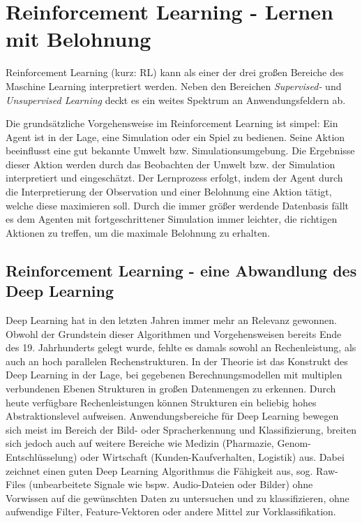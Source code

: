 
\chapter{Reinforcement Learning - Lernen mit Belohnung}
\label{chap:rl}
%

	Reinforcement Learning (kurz: RL) kann als einer der drei großen Bereiche des Maschine Learning interpretiert werden. Neben den Bereichen \textit{Supervised-} und  \textit{Unsupervised Learning} deckt es ein weites Spektrum an Anwendungsfeldern ab.
	
	Die grundsätzliche Vorgehensweise im Reinforcement Learning ist simpel: Ein Agent ist in der Lage, eine Simulation oder ein Spiel zu bedienen. Seine Aktion beeinflusst eine gut bekannte Umwelt bzw. Simulationsumgebung. Die Ergebnisse dieser Aktion werden durch das Beobachten der Umwelt bzw. der Simulation interpretiert und eingeschätzt. Der Lernprozess erfolgt, indem der Agent durch die Interpretierung der Observation und einer Belohnung eine Aktion tätigt, welche diese maximieren soll. Durch die immer größer werdende Datenbasis fällt es dem Agenten mit fortgeschrittener Simulation immer leichter, die \glqq richtigen\grqq{} Aktionen zu treffen, um die maximale Belohnung zu erhalten.
	

\section{Reinforcement Learning - eine Abwandlung des Deep Learning}
\label{sec:rl_dl}
	Deep Learning hat in den letzten Jahren immer mehr an Relevanz gewonnen. Obwohl der Grundstein dieser Algorithmen und Vorgehensweisen bereits Ende des 19. Jahrhunderts gelegt wurde, fehlte es damals sowohl an Rechenleistung, als auch an hoch parallelen Rechenstrukturen. In der Theorie ist das Konstrukt des Deep Learning in der Lage, bei gegebenen Berechnungsmodellen mit multiplen verbundenen Ebenen Strukturen in großen Datenmengen zu erkennen. Durch heute verfügbare Rechenleistungen können Strukturen ein beliebig hohes Abstraktionslevel aufweisen. Anwendungsbereiche für Deep Learning bewegen sich meist im Bereich der Bild- oder Spracherkennung und Klassifizierung, breiten sich jedoch auch auf weitere Bereiche wie Medizin (Pharmazie, Genom-Entschlüsselung) oder Wirtschaft (Kunden-Kaufverhalten, Logistik) aus. Dabei zeichnet einen guten Deep Learning Algorithmus die Fähigkeit aus, sog. Raw-Files (unbearbeitete Signale wie bspw. Audio-Dateien oder Bilder) ohne Vorwissen auf die gewünschten Daten zu untersuchen und zu klassifizieren, ohne aufwendige Filter, Feature-Vektoren oder andere Mittel zur Vorklassifikation.
	
